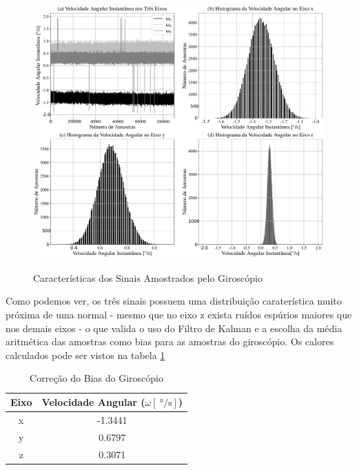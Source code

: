 \begin{figure}[H]
  \caption{Características dos Sinais Amostrados pelo Giroscópio}
      \includegraphics[scale=.4]{metodologia/img/bias_correction}
  \label{fig:bias_correction}
\end{figure}

Como podemos ver, os três sinais possuem uma distribuição caraterística muito próxima de uma normal - mesmo que no eixo z exista ruídos espúrios maiores que nos demais eixos - o que valida o uso do Filtro de Kalman e a escolha da média aritmética das amostras como bias para as amostras do giroscópio. Os calores calculados pode ser vistos na tabela \ref{tab:bias_correction} 

\begin{table}[H]
  \caption{Correção do Bias do Giroscópio}
  \label{tab:bias_correction}
  \centering%
  \begin{minipage}{.42\textwidth}
    \begin{tabular*}{\textwidth}{cc}
      \hline
      {Eixo} & Velocidade Angular ($\omega [\SI{}{\degree\per\second}]$)\\ \hline
      \hline
      x  &  -1.3441 \\ 
      y  &  0.6797 \\
      z  &  0.3071 \\ \hline
    \end{tabular*}
  \end{minipage}
\end{table}

